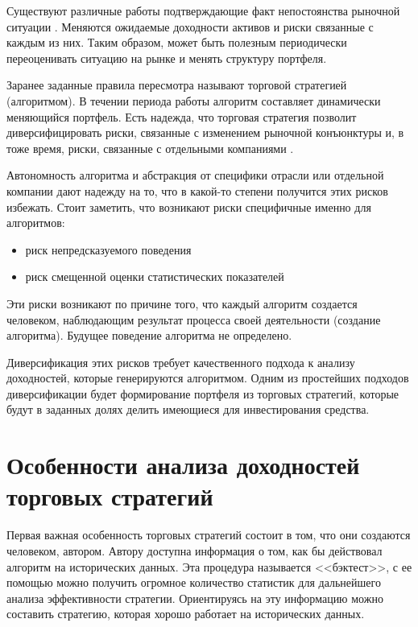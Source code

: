 Существуют различные работы подтверждающие факт непостоянства рыночной ситуации \citep{billio2003, koutmos2012}. Меняются ожидаемые доходности активов и риски связанные с каждым из них. Таким образом, может быть полезным периодически переоценивать ситуацию на рынке и менять структуру портфеля. 

Заранее заданные правила пересмотра называют торговой стратегией (алгоритмом). В течении периода работы алгоритм составляет динамически меняющийся портфель. Есть надежда, что торговая стратегия позволит диверсифицировать риски, связанные с изменением рыночной конъюнктуры и, в тоже время, риски, связанные с отдельными компаниями \citep{lorenz2008thesis}. 

Автономность алгоритма и абстракция от специфики отрасли или отдельной компании дают надежду на то, что в какой-то степени получится этих рисков избежать. Стоит заметить, что возникают риски специфичные именно для алгоритмов:
\begin{itemize}
	\item риск непредсказуемого поведения
	\item риск смещенной оценки статистических показателей
\end{itemize}
Эти риски возникают по причине того, что каждый алгоритм создается человеком, наблюдающим результат процесса своей деятельности (создание алгоритма). Будущее поведение алгоритма не определено.

Диверсификация этих рисков требует качественного подхода к анализу доходностей, которые генерируются алгоритмом. Одним из простейших подходов диверсификации будет формирование портфеля из торговых стратегий, которые будут в заданных долях делить имеющиеся для инвестирования средства.

\section{Особенности анализа доходностей торговых стратегий}
Первая важная особенность торговых стратегий состоит в том, что они создаются человеком, автором. Автору доступна информация о том, как бы действовал алгоритм на исторических данных. Эта процедура называется <<бэктест>>, с ее помощью можно получить огромное количество статистик для дальнейшего анализа эффективности стратегии. Ориентируясь на эту информацию можно составить стратегию, которая хорошо работает на исторических данных. 

